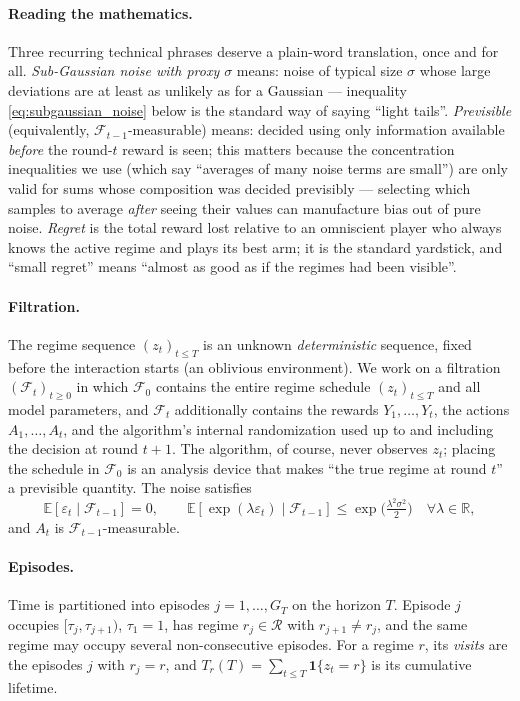 \documentclass[11pt]{article}
\newcommand{\Fcal}{\mathcal F}
\newcommand{\Rcal}{\mathcal R}
\newcommand{\E}{\mathbb E}
\newcommand{\one}{\mathbf 1}
\begin{document}
\paragraph{Reading the mathematics.}
Three recurring technical phrases deserve a plain-word translation, once and for all. \emph{Sub-Gaussian noise with proxy $\sigma$} means: noise of typical size $\sigma$ whose large deviations are at least as unlikely as for a Gaussian --- inequality \eqref{eq:subgaussian_noise} below is the standard way of saying ``light tails''. \emph{Previsible} (equivalently, $\Fcal_{t-1}$-measurable) means: decided using only information available \emph{before} the round-$t$ reward is seen; this matters because the concentration inequalities we use (which say ``averages of many noise terms are small'') are only valid for sums whose composition was decided previsibly --- selecting which samples to average \emph{after} seeing their values can manufacture bias out of pure noise. \emph{Regret} is the total reward lost relative to an omniscient player who always knows the active regime and plays its best arm; it is the standard yardstick, and ``small regret'' means ``almost as good as if the regimes had been visible''.

\paragraph{Filtration.}
The regime sequence $(z_t)_{t\le T}$ is an unknown \emph{deterministic} sequence, fixed before the interaction starts (an oblivious environment). We work on a filtration $(\Fcal_t)_{t\ge0}$ in which $\Fcal_0$ contains the entire regime schedule $(z_t)_{t\le T}$ and all model parameters, and $\Fcal_t$ additionally contains the rewards $Y_1,\ldots,Y_t$, the actions $A_1,\ldots,A_t$, and the algorithm's internal randomization used up to and including the decision at round $t{+}1$. The algorithm, of course, never observes $z_t$; placing the schedule in $\Fcal_0$ is an analysis device that makes ``the true regime at round $t$'' a previsible quantity. The noise satisfies
\begin{equation}
    \E[\varepsilon_t\mid \Fcal_{t-1}]=0,
    \qquad
    \E[\exp(\lambda\varepsilon_t)\mid \Fcal_{t-1}]
    \le \exp\!\big(\tfrac{\lambda^2\sigma^2}{2}\big)
    \quad \forall \lambda\in\mathbb R,
    \label{eq:subgaussian_noise}
\end{equation}
and $A_t$ is $\Fcal_{t-1}$-measurable.

\paragraph{Episodes.}
Time is partitioned into episodes $j=1,\ldots,G_T$ on the horizon $T$. Episode $j$ occupies $[\tau_j,\tau_{j+1})$, $\tau_1=1$, has regime $r_j\in\Rcal$ with $r_{j+1}\ne r_j$, and the same regime may occupy several non-consecutive episodes. For a regime $r$, its \emph{visits} are the episodes $j$ with $r_j=r$, and $T_r(T)=\sum_{t\le T}\one\{z_t=r\}$ is its cumulative lifetime.
\end{document}
